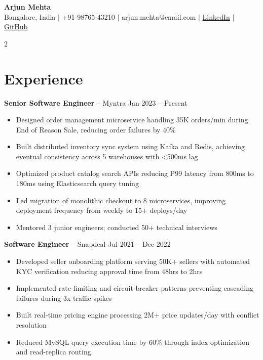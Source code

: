\documentclass[9pt,a4paper]{article}
\begin{document}
\begin{center}
{\large\bfseries Arjun Mehta}\\[2pt]
{\footnotesize Bangalore, India $\mid$ +91-98765-43210 $\mid$ arjun.mehta@email.com $\mid$ \href{https://linkedin.com/in/arjunmehta}{LinkedIn} $\mid$ \href{https://github.com/arjunmehta}{GitHub}}
\end{center}

\vspace{2pt}

\begin{paracol}{2}

\section{Experience}

{\bfseries Senior Software Engineer} -- Myntra \hfill {\tiny\color{accent} Jan 2023 -- Present}
\begin{itemize}
    \item Designed order management microservice handling 35K orders/min during End of Reason Sale, reducing order failures by 40\%
    \item Built distributed inventory sync system using Kafka and Redis, achieving eventual consistency across 5 warehouses with <500ms lag
    \item Optimized product catalog search APIs reducing P99 latency from 800ms to 180ms using Elasticsearch query tuning
    \item Led migration of monolithic checkout to 8 microservices, improving deployment frequency from weekly to 15+ deploys/day
    \item Mentored 3 junior engineers; conducted 50+ technical interviews
\end{itemize}

\vspace{3pt}
{\bfseries Software Engineer} -- Snapdeal \hfill {\tiny\color{accent} Jul 2021 -- Dec 2022}
\begin{itemize}
    \item Developed seller onboarding platform serving 50K+ sellers with automated KYC verification reducing approval time from 48hrs to 2hrs
    \item Implemented rate-limiting and circuit-breaker patterns preventing cascading failures during 3x traffic spikes
    \item Built real-time pricing engine processing 2M+ price updates/day with conflict resolution
    \item Reduced MySQL query execution time by 60\% through index optimization and read-replica routing
\end{itemize}


\end{paracol}
\end{document}

